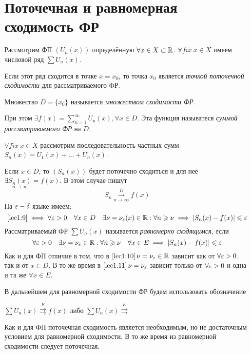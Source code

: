\documentclass[../../main.tex]{subfiles}
\begin{document}
\section{Поточечная и равномерная сходимость ФР}
Рассмотрим ФП $(U_n(x))$ определённую $\forall x \in X \subset \mathbb{R}$. 
$\forall fix \ x \in X$ имеем числовой ряд $\sum U_n(x)$. 

Если этот ряд сходится в точке $x = x_0$, то точка $x_0$ является 
\emph{точкой поточечной сходимости} для рассматриваемого ФР. 

Множество $D = \{x_0\}$ называется \emph{множеством сходимости ФР}.

При этом $\exists f(x) = \sum\limits_{n=1}^{\infty} U_n(x), \forall x \in D$.
Эта функция называтеся \emph{суммой рассматриваемого ФР} на $D$.

$\forall fix \ x \in X$ рассмотрим последовательность частных сумм 
$S_n(x) = U_1(x) + \ldots + U_n(x)$. 	

Если $x \in D$, то $(S_n(x))$ будет поточечно сходиться и для неё 
$\exists \underset{n \to \infty}{S_n(x)} = f(x)$. В этом случае
пишут 
\begin{equation}
\label{lec1:9}
S_n \overset{D}{\underset{n \to \infty}\longrightarrow} f(x)
\end{equation}
На $\varepsilon-\delta$ языке имеем:
\begin{equation}
\label{lec1:10}
\eqref{lec1:9} \iff \forall \varepsilon > 0\quad
\forall x \in D \quad \exists \nu = \nu_\varepsilon(x) \in \mathbb{R} :
\forall n \geqslant \nu \implies |S_n(x) - f(x)| \leqslant \varepsilon 
\end{equation}
Рассматриваемый ФР $\sum U_n(x)$ называется \emph{равномерно сходящимся},
если  
\begin{equation}
\label{lec1:11}
\forall \varepsilon > 0 \quad \exists \nu = \nu_\varepsilon \in \mathbb{R} :
\forall n \geqslant \nu \quad \forall x \in E \implies 
|S_n(x) - f(x)| \leqslant \varepsilon
\end{equation}
Как и для ФП отличие в том, что в $\eqref{lec1:10}\, \nu = \nu_\varepsilon \in \mathbb{R}$ 
зависит как от $\forall \varepsilon > 0$, так и от $x \in D$. В то же время в 
$\eqref{lec1:11}\, \nu = \nu_\varepsilon$ зависит только от $\forall \varepsilon > 0$ и 
одна и та же $\forall x \in E$.  

В дальнейшем для равномерной сходимости ФР будем использовать обозначение
 
$\sum U_n(x) \overset{E}{\rightrightarrows} f(x)$ либо 
$\sum U_n(x) \overset{E}{\rightrightarrows}$

Как и для ФП поточечная сходимость является необходимым, 
но не достаточным условием для равномерной сходимости. В то же время
из равномерной сходимости следует поточечная.
\end{document}
